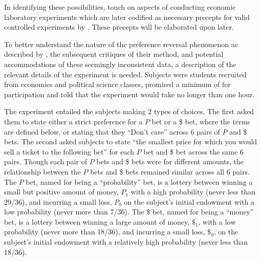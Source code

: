 \documentclass[../main.tex]{subfiles}
\begin{document}
In identifying these possibilities, \textcite{Grether1979} touch on aspects of conducting economic laboratory experiments which are later codified as necessary precepts for valid controlled experiments by \textcite{Smith1982}.{\footnotemark} 
These precepts will be elaborated upon later.

\addtocounter{footnote}{-1}

To better understand the nature of the preference reversal phenomenon as described by \textcite{Grether1979}, the subsequent critiques of their method, and potential accommodations of these seemingly inconsistent data, a description of the relevant details of the experiment is needed.
Subjects were students recruited from economics and political science classes, promised a minimum of  for participation and told that the experiment would take no longer than one hour.

The experiment entailed the subjects making 2 types of choices.
The first asked them to state either a strict preference for a $P$ bet or a {\$} bet, where the terms are defined below, or stating that they \enquote{Don't care} across 6 pairs of $P$ and {\$} bets.
The second asked subjects to state \enquote{the smallest price for which you would sell a ticket to the following bet} \parencite*[630]{Grether1979} for each $P$ bet and {\$} bet across the same 6 pairs.
Though each pair of $P$ bets and {\$} bets were for different amounts, the relationship between the $P$ bets and {\$} bets remained similar across all 6 pairs.
The $P$ bet, named for being a \enquote{probability} bet, is a lottery between winning a small but positive amount of money, $P_1$ with a high probability (never less than 29/36), and incurring a small loss, $P_0$ on the subject's initial endowment with a low probability (never more than 7/36).
The {\$} bet, named for being a \enquote{money} bet, is a lottery between winning a large amount of money, ${\$}_1$, with a low probability (never more than 18/36), and incurring a small loss, ${\$}_0$, on the subject's initial endowment with a relatively high probability (never less than 18/36).
\end{document}
